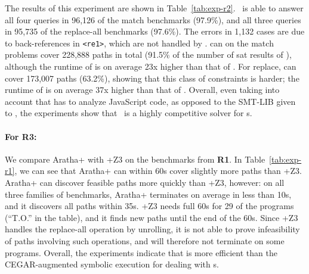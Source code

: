 The results of this experiment are shown in
Table~\ref{tab:exp-r2}. \ostrich\ is able to answer all four queries
in 96,126 of the match benchmarks (97.9\%), and all three queries in
95,735 of the replace-all benchmarks (97.6\%). The errors in 1,132 cases
are due to back-references in \verb!<re1>!, which are not handled by
\ostrich. \expose{} can on the match problems cover 228,888 paths in
total (91.5\% of the number of sat results of \ostrich), although the
runtime of \expose{} is on average 23x higher than that of
\ostrich. For replace, \expose{} can cover 173,007 paths (63.2\%),
showing that this class of constraints is harder; the runtime of
\expose{} is on average 37x higher than that of \ostrich.  Overall,
even taking into account that \expose{} has to analyze JavaScript
code, as opposed to the SMT-LIB given to \ostrich, the experiments
show that \ostrich\ is a highly competitive solver for {\regexp}s.




\paragraph{For \textbf{R3}:} We compare Aratha+{\ostrich} with
\expose{}+Z3 on the benchmarks from \textbf{R1}. In
Table~\ref{tab:exp-r1}, we can see that Aratha+{\ostrich} can within
60s cover slightly more paths than \expose{}+Z3. Aratha+{\ostrich} can
discover feasible paths more quickly than \expose{}+Z3, however: on
all three families of benchmarks, Aratha+{\ostrich} terminates on
average in less than 10s, and it discovers all paths 
within 35s. \expose{}+Z3 needs full 60s for
29 of the programs (``T.O.'' in the table),
and it finds new paths until the end of the 60s. Since \expose{}+Z3
handles the replace-all operation by unrolling, it is not able to
prove infeasibility of paths involving such operations, and will
therefore not terminate on some programs.
Overall, the experiments indicate that {\ostrich} is more
efficient than the CEGAR-augmented symbolic execution for dealing
with {\regexp}s.
